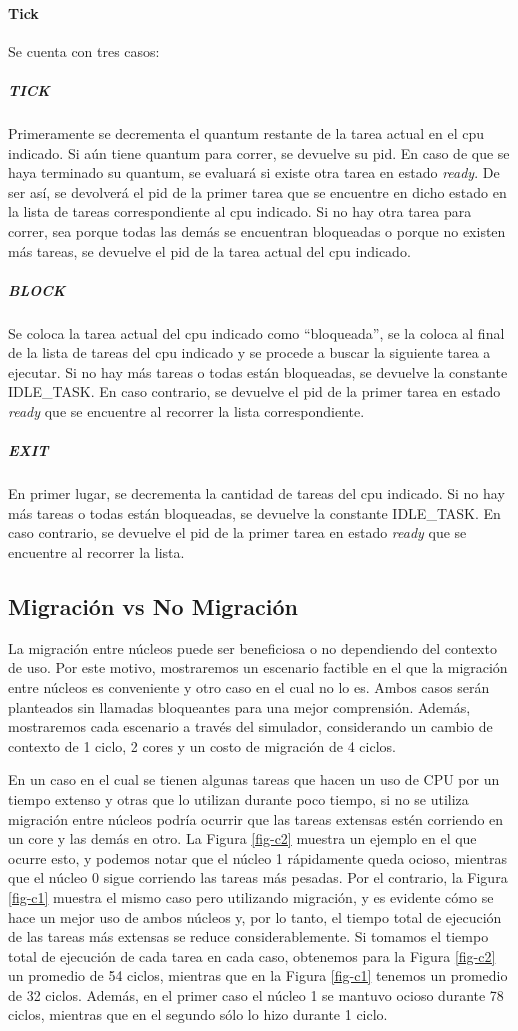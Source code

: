 \paragraph{Tick} Se cuenta con tres casos:

\subparagraph{TICK} Primeramente se decrementa el quantum restante de la tarea actual en el cpu indicado.  Si aún tiene quantum para correr, se devuelve su pid.  En caso de que se haya terminado su quantum, se evaluará si existe otra tarea en estado {\it ready}.  De ser así, se devolverá el pid de la primer tarea que se encuentre en dicho estado en la lista de tareas correspondiente al cpu indicado.  Si no hay otra tarea para correr, sea porque todas las demás se encuentran bloqueadas o porque no existen más tareas, se devuelve el pid de la tarea actual del cpu indicado.
\subparagraph{BLOCK} Se coloca la tarea actual del cpu indicado como ``bloqueada'', se la coloca al final de la lista de tareas del cpu indicado y se procede a buscar la siguiente tarea a ejecutar.  Si no hay más tareas o todas están bloqueadas, se devuelve la constante IDLE_TASK.  En caso contrario, se devuelve el pid de la primer tarea en estado {\it ready} que se encuentre al recorrer la lista correspondiente.
\subparagraph{EXIT} En primer lugar, se decrementa la cantidad de tareas del cpu indicado. Si no hay más tareas o todas están bloqueadas, se devuelve la constante IDLE_TASK.  En caso contrario, se devuelve el pid de la primer tarea en estado {\it ready} que se encuentre al recorrer la lista.

\subsection{Migración vs No Migración}

La migración entre núcleos puede ser beneficiosa o no dependiendo del contexto de uso.  Por este motivo, mostraremos un escenario factible en el que la migración entre núcleos es conveniente y otro caso en el cual no lo es. Ambos casos serán planteados sin llamadas bloqueantes para una mejor comprensión.  Además, mostraremos cada escenario a través del simulador, considerando un cambio de contexto de 1 ciclo, 2 cores y un costo de migración de 4 ciclos.

En un caso en el cual se tienen algunas tareas que hacen un uso de CPU por un tiempo extenso y otras que lo utilizan durante poco tiempo, si no se utiliza migración entre núcleos podría ocurrir que las tareas extensas estén corriendo en un core y las demás en otro. La Figura \ref{fig-c2} muestra un ejemplo en el que ocurre esto, y podemos notar que el núcleo 1 rápidamente queda ocioso, mientras que el núcleo 0 sigue corriendo las tareas más pesadas. Por el contrario, la Figura \ref{fig-c1} muestra el mismo caso pero utilizando migración, y es evidente cómo se hace un mejor uso de ambos núcleos y, por lo tanto, el tiempo total de ejecución de las tareas más extensas se reduce considerablemente.  Si tomamos el tiempo total de ejecución de cada tarea en cada caso, obtenemos para la Figura \ref{fig-c2} un promedio de 54 ciclos, mientras que en la Figura \ref{fig-c1} tenemos un promedio de 32 ciclos.  Además, en el primer caso el núcleo 1 se mantuvo ocioso durante 78 ciclos, mientras que en el segundo sólo lo hizo durante 1 ciclo.

